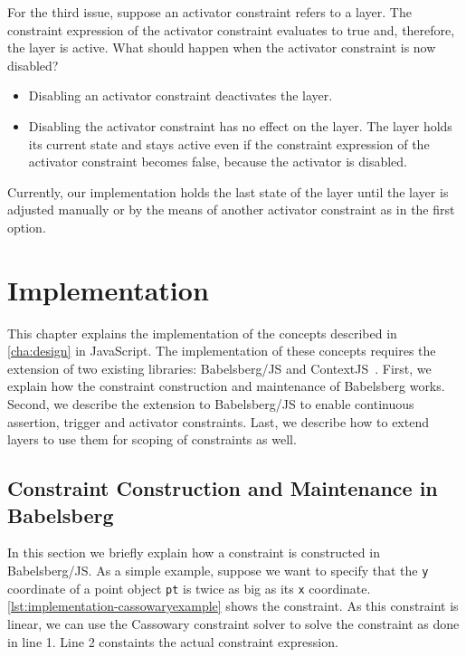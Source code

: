 For the third issue, suppose an activator constraint refers to a layer. The constraint expression of the activator constraint evaluates to true and, therefore, the layer is active. What should happen when the activator constraint is now disabled?
\begin{itemize}
\item[1) ] Disabling an activator constraint deactivates the layer.
\item[2) ] Disabling the activator constraint has no effect on the layer. The layer holds its current state and stays active even if the constraint expression of the activator constraint becomes false, because the activator is disabled.
\end{itemize}
Currently, our implementation holds the last state of the layer until the layer is adjusted manually or by the means of another activator constraint as in the first option.

\chapter{Implementation}
\label{cha:implementation}
This chapter explains the implementation of the concepts described in \autoref{cha:design} in JavaScript.
The implementation of these concepts requires the extension of two existing libraries: Babelsberg/JS and ContextJS~\cite{Lincke:2011:instance-specific-adaption}.
First, we explain how the constraint construction and maintenance of Babelsberg works.
Second, we describe the extension to Babelsberg/JS to enable continuous assertion, trigger and activator constraints. Last, we describe how to extend layers to use them for scoping of constraints as well.
%

\section{Constraint Construction and Maintenance in Babelsberg}
\label{sec:implementation-babelsberg-ccm}
In this section we briefly explain how a constraint is constructed in Babelsberg/JS. As a simple example, suppose we want to specify that the \texttt{y} coordinate of a point object \texttt{pt} is twice as big as its \texttt{x} coordinate. \autoref{lst:implementation-cassowaryexample} shows the constraint.
As this constraint is linear, we can use the Cassowary constraint solver to solve the constraint as done in line 1. Line 2 constaints the actual constraint expression.

